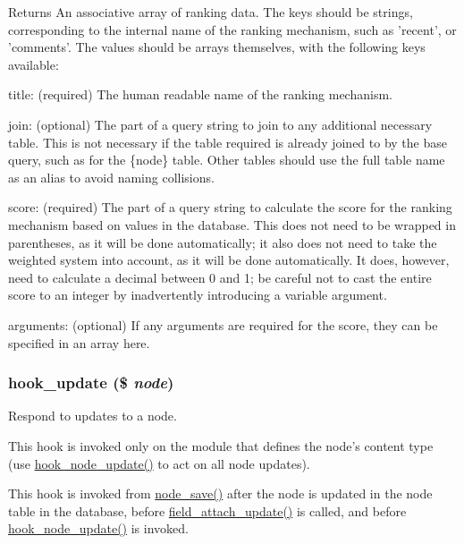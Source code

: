 \begin{DoxyReturn}{Returns}
An associative array of ranking data. The keys should be strings, corresponding to the internal name of the ranking mechanism, such as 'recent', or 'comments'. The values should be arrays themselves, with the following keys available:
\begin{DoxyItemize}
\item title: (required) The human readable name of the ranking mechanism.
\item join: (optional) The part of a query string to join to any additional necessary table. This is not necessary if the table required is already joined to by the base query, such as for the \{node\} table. Other tables should use the full table name as an alias to avoid naming collisions.
\item score: (required) The part of a query string to calculate the score for the ranking mechanism based on values in the database. This does not need to be wrapped in parentheses, as it will be done automatically; it also does not need to take the weighted system into account, as it will be done automatically. It does, however, need to calculate a decimal between 0 and 1; be careful not to cast the entire score to an integer by inadvertently introducing a variable argument.
\item arguments: (optional) If any arguments are required for the score, they can be specified in an array here. 
\end{DoxyItemize}
\end{DoxyReturn}
\hypertarget{group__node__api__hooks_gaf9c98e3839e9405df42b50c8cdfa9dca}{
\subsubsection[{hook\_\-update}]{\setlength{\rightskip}{0pt plus 5cm}hook\_\-update (\$ {\em node})}}
\label{group__node__api__hooks_gaf9c98e3839e9405df42b50c8cdfa9dca}
Respond to updates to a node.

This hook is invoked only on the module that defines the node's content type (use \hyperlink{group__node__api__hooks_gac66c767cc922fcbfdaf17252e5d87d9d}{hook\_\-node\_\-update()} to act on all node updates).

This hook is invoked from \hyperlink{node_8module_a26add7591be64b30a18232927ef14faf}{node\_\-save()} after the node is updated in the node table in the database, before \hyperlink{group__field__attach_ga8d15efdca36306ea04552bed4986e77b}{field\_\-attach\_\-update()} is called, and before \hyperlink{group__node__api__hooks_gac66c767cc922fcbfdaf17252e5d87d9d}{hook\_\-node\_\-update()} is invoked.


